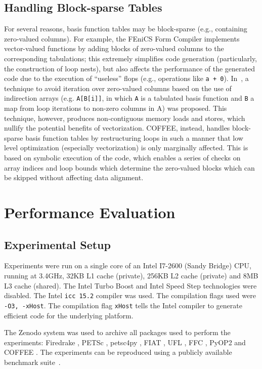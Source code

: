 \subsection{Handling Block-sparse Tables}
\label{sec:zeros}
For several reasons, basis function tables may be block-sparse (e.g., containing zero-valued columns). For example, the FEniCS Form Compiler implements vector-valued functions by adding blocks of zero-valued columns to the corresponding tabulations; this extremely simplifies code generation (particularly, the construction of loop nests), but also affects the performance of the generated code due to the execution of ``useless'' flops (e.g., operations like \texttt{a + 0}). In~\cite{quadrature-olegaard}, a technique to avoid iteration over zero-valued columns based on the use of indirection arrays (e.g. \texttt{A[B[i]]}, in which \texttt{A} is a tabulated basis function and \texttt{B} a map from loop iterations to non-zero columns in A) was proposed. This technique, however, produces non-contiguous memory loads and stores, which nullify the potential benefits of vectorization. COFFEE, instead, handles block-sparse basis function tables by restructuring loops in such a manner that low level optimization (especially vectorization) is only marginally affected. This is based on symbolic execution of the code, which enables a series of checks on array indices and loop bounds which determine the zero-valued blocks which can be skipped without affecting data alignment.

\section{Performance Evaluation}
\label{sec:perf-results}

\subsection{Experimental Setup}

Experiments were run on a single core of an Intel I7-2600 (Sandy Bridge) CPU, running at 3.4GHz, 32KB L1 cache (private), 256KB L2 cache (private) and 8MB L3 cache (shared). The Intel Turbo Boost and Intel Speed Step technologies were disabled. The Intel \texttt{icc 15.2} compiler was used. The compilation flags used were \texttt{-O3, -xHost}. The compilation flag \texttt{xHost} tells the Intel compiler to generate efficient code for the underlying platform.

The Zenodo system was used to archive all packages used to perform the experiments: Firedrake \citep{lawrence_mitchell_2016_49284}, PETSc \citep{barry_smith_2016_49285}, petsc4py \citep{firedrake_2016_49283}, FIAT \citep{marie_e_rognes_2016_49280}, UFL \citep{martin_sandve_alnaes_2016_49282}, FFC \citep{anders_logg_2016_49276}, PyOP2 \citep{florian_rathgeber_2016_49281} and COFFEE \citep{fabio_luporini_2016_49279}. The experiments can be reproduced using a publicly available benchmark suite~\citep{florian_rathgeber_2016_49290}.

